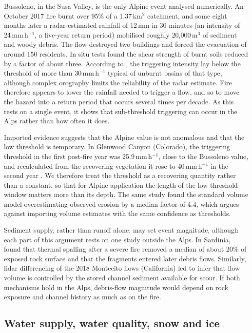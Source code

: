 \documentclass[11pt,a4paper]{article}
\begin{document}
Bussoleno, in the Susa Valley, is the only Alpine event analysed numerically. An October 2017 fire burnt over 95\% of a 1.37\,km$^2$ catchment, and some eight months later a radar-estimated rainfall of 12\,mm in 30 minutes (an intensity of 24\,mm\,h$^{-1}$, a five-year return period) mobilised roughly 20{,}000\,m$^3$ of sediment and woody debris. The flow destroyed two buildings and forced the evacuation of around 150 residents. In situ tests found the shear strength of burnt soils reduced by a factor of about three. According to \citet{laporta_postwildfire_2025}, the triggering intensity lay below the threshold of more than 30\,mm\,h$^{-1}$ typical of unburnt basins of that type, although complex orography limits the reliability of the radar estimate. Fire therefore appears to lower the rainfall needed to trigger a flow, and so to move the hazard into a return period that occurs several times per decade. As this rests on a single event, it shows that sub-threshold triggering can occur in the Alps rather than how often it does.

Imported evidence suggests that the Alpine value is not anomalous and that the low threshold is temporary. In Glenwood Canyon (Colorado), the triggering threshold in the first post-fire year was 25.9\,mm\,h$^{-1}$, close to the Bussoleno value, and recalculated from the recovering vegetation it rose to 40\,mm\,h$^{-1}$ in the second year \citep{rengers_evaluating_2024}. We therefore treat the threshold as a recovering quantity rather than a constant, so that for Alpine application the length of the low-threshold window matters more than its depth. The same study found the standard volume model overestimating observed erosion by a median factor of 4.4, which argues against importing volume estimates with the same confidence as thresholds.

Sediment supply, rather than runoff alone, may set event magnitude, although each part of this argument rests on one study outside the Alps. In Sardinia, \citet{pala_sediment_2025} found that thermal spalling after a severe fire removed a median of about 20\% of exposed rock surface and that the fragments entered later debris flows. Similarly, lidar differencing of the 2018 Montecito flows (California) led \citet{morell_sediment_2021} to infer that flow volume is controlled by the stored channel sediment available for scour. If both mechanisms hold in the Alps, debris-flow magnitude would depend on rock exposure and channel history as much as on the fire.

\subsection{Water supply, water quality, snow and ice}
\end{document}
